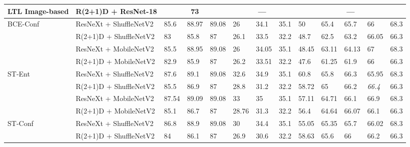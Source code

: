 \documentclass[a4paper,conference]{IEEEtran}
\begin{document}
\begin{table*}[h]
\begin{center}
{\begin{tabular}{lllllllllllll}
LTL Image-based \cite{gao2020listen} & \cellcolor[HTML]{EFEFEF}R(2+1)D + ResNet-18 & \multicolumn{3}{c}{73} & \multicolumn{3}{c}{\cellcolor[HTML]{EFEFEF}—} & \multicolumn{5}{c}{—} \\ \hline
BCE-Conf \cite{devries2018learning} & \cellcolor[HTML]{EFEFEF}ResNeXt + ShuffleNetV2 & 85.6 & 88.97 & 89.08 & \cellcolor[HTML]{EFEFEF}26 & \cellcolor[HTML]{EFEFEF}34.1 & \cellcolor[HTML]{EFEFEF}35.1 & 50 & 65.4 & 65.7 & 66 & 68.3 \\
 & \cellcolor[HTML]{EFEFEF}R(2+1)D + ShuffleNetV2 & 83 & 85.8 & 87 & \cellcolor[HTML]{EFEFEF}26.1 & \cellcolor[HTML]{EFEFEF}33.5 & \cellcolor[HTML]{EFEFEF}32.2 & 48.7 & 62.5 & 63.2 & 66.05 & 66.3 \\
 & \cellcolor[HTML]{EFEFEF}ResNeXt + MobileNetV2 & 85.5 & 88.95 & 89.08 & \cellcolor[HTML]{EFEFEF}26 & \cellcolor[HTML]{EFEFEF}34.05 & \cellcolor[HTML]{EFEFEF}35.1 & 48.45 & 63.11 & 64.13 & 67 & 68.3 \\
 & \cellcolor[HTML]{EFEFEF}R(2+1)D + MobileNetV2 & 82.9 & 85.9 & 87 & \cellcolor[HTML]{EFEFEF}26.2 & \cellcolor[HTML]{EFEFEF}33.51 & \cellcolor[HTML]{EFEFEF}32.2 & 47.6 & 61.25 & 61.9 & 66 & 66.3 \\ \hline
ST-Ent \cite{gal2016uncertainty} & \cellcolor[HTML]{EFEFEF}ResNeXt + ShuffleNetV2 & 87.6 & 89.1 & 89.08 & \cellcolor[HTML]{EFEFEF}32.6 & \cellcolor[HTML]{EFEFEF}34.9 & \cellcolor[HTML]{EFEFEF}35.1 & 60.8 & 65.8 & 66.3 & 65.95 & 68.3 \\
 & \cellcolor[HTML]{EFEFEF}R(2+1)D + ShuffleNetV2 & 85.5 & 86.9 & 87 & \cellcolor[HTML]{EFEFEF}28.8 & \cellcolor[HTML]{EFEFEF}31.2 & \cellcolor[HTML]{EFEFEF}32.2 & 58.72 & 65 & 66.2 & \textit{66.4} & 66.3 \\
 & \cellcolor[HTML]{EFEFEF}ResNeXt + MobileNetV2 & 87.54 & 89.09 & 89.08 & \cellcolor[HTML]{EFEFEF}33 & \cellcolor[HTML]{EFEFEF}35 & \cellcolor[HTML]{EFEFEF}35.1 & 57.11 & 64.71 & 66.1 & 66.9 & 68.3 \\
 & \cellcolor[HTML]{EFEFEF}R(2+1)D + MobileNetV2 & 85.1 & 86.7 & 87 & \cellcolor[HTML]{EFEFEF}28.76 & \cellcolor[HTML]{EFEFEF}31.3 & \cellcolor[HTML]{EFEFEF}32.2 & 56.4 & 64.64 & 66.07 & 66.1 & 66.3 \\ \hline
ST-Conf & \cellcolor[HTML]{EFEFEF}ResNeXt + ShuffleNetV2 & 86.8 & 88.9 & 89.08 & \cellcolor[HTML]{EFEFEF}30 & \cellcolor[HTML]{EFEFEF}34.4 & \cellcolor[HTML]{EFEFEF}35.1 & 55.05 & 65.35 & 65.7 & 66.02 & 68.3 \\
 & \cellcolor[HTML]{EFEFEF}R(2+1)D + ShuffleNetV2 & 84 & 86.1 & 87 & \cellcolor[HTML]{EFEFEF}26.9 & \cellcolor[HTML]{EFEFEF}30.6 & \cellcolor[HTML]{EFEFEF}32.2 & 58.63 & 65.6 & 66 & 66.2 & 66.3 \\

\end{tabular}}
\end{center}
\end{table*}
\end{document}
